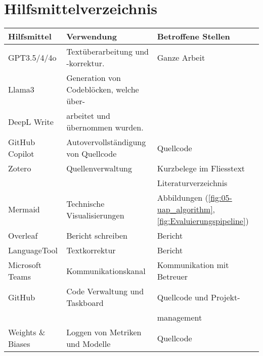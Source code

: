 \section*{Hilfsmittelverzeichnis}

\begin{table}[ht!]
    \centering
    \begin{tabular}{l|l|l}
        
        \hline
        \textbf{Hilfsmittel} & \textbf{Verwendung} & \textbf{Betroffene Stellen} \\ 

        \hline
        GPT3.5/4/4o & Textüberarbeitung und -korrektur. & Ganze Arbeit \\
        Llama3 & Generation von Codeblöcken, welche über- & \\
        DeepL Write & arbeitet und übernommen wurden. & \\

        \hline
        GitHub Copilot & Autovervollständigung von Quellcode & Quellcode \\ 

        \hline
        Zotero & Quellenverwaltung & Kurzbelege im Fliesstext \\ 
         & & Literaturverzeichnis \\
         
        \hline
        Mermaid & Technische Visualisierungen & Abbildungen (\ref{fig:05-uap_algorithm}, \ref{fig:Evaluierungspipeline})\\

        \hline
        Overleaf & Bericht schreiben & Bericht \\

        \hline
        LanguageTool & Textkorrektur & Bericht \\

        \hline
        Microsoft Teams & Kommunikationskanal & Kommunikation mit Betreuer \\

        \hline
        GitHub & Code Verwaltung und Taskboard & Quellcode und Projekt- \\
        & & management \\

        \hline
        Weights \& Biases & Loggen von Metriken und Modelle & Quellcode \\


\end{tabular}
\end{table}

